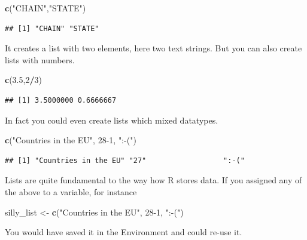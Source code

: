 \documentclass[
]{article}
\newenvironment{Shaded}{\begin{snugshade}}{\end{snugshade}}
\newcommand{\DecValTok}[1]{\textcolor[rgb]{0.00,0.00,0.81}{#1}}
\newcommand{\FloatTok}[1]{\textcolor[rgb]{0.00,0.00,0.81}{#1}}
\newcommand{\FunctionTok}[1]{\textcolor[rgb]{0.13,0.29,0.53}{\textbf{#1}}}
\newcommand{\NormalTok}[1]{#1}
\newcommand{\OtherTok}[1]{\textcolor[rgb]{0.56,0.35,0.01}{#1}}
\newcommand{\SpecialCharTok}[1]{\textcolor[rgb]{0.81,0.36,0.00}{\textbf{#1}}}
\newcommand{\StringTok}[1]{\textcolor[rgb]{0.31,0.60,0.02}{#1}}
\begin{document}
\begin{Shaded}
\begin{Highlighting}[]
\FunctionTok{c}\NormalTok{(}\StringTok{"CHAIN"}\NormalTok{,}\StringTok{"STATE"}\NormalTok{)}
\end{Highlighting}
\end{Shaded}

\begin{verbatim}
## [1] "CHAIN" "STATE"
\end{verbatim}

It creates a list with two elements, here two text strings. But you can
also create lists with numbers.

\begin{Shaded}
\begin{Highlighting}[]
\FunctionTok{c}\NormalTok{(}\FloatTok{3.5}\NormalTok{,}\DecValTok{2}\SpecialCharTok{/}\DecValTok{3}\NormalTok{)}
\end{Highlighting}
\end{Shaded}

\begin{verbatim}
## [1] 3.5000000 0.6666667
\end{verbatim}

In fact you could even create lists which mixed datatypes.

\begin{Shaded}
\begin{Highlighting}[]
\FunctionTok{c}\NormalTok{(}\StringTok{"Countries in the EU"}\NormalTok{, }\DecValTok{28{-}1}\NormalTok{, }\StringTok{":{-}("}\NormalTok{)}
\end{Highlighting}
\end{Shaded}

\begin{verbatim}
## [1] "Countries in the EU" "27"                  ":-("
\end{verbatim}

Lists are quite fundamental to the way how R stores data. If you
assigned any of the above to a variable, for instance

\begin{Shaded}
\begin{Highlighting}[]
\NormalTok{silly\_list }\OtherTok{\textless{}{-}} \FunctionTok{c}\NormalTok{(}\StringTok{"Countries in the EU"}\NormalTok{, }\DecValTok{28{-}1}\NormalTok{, }\StringTok{":{-}("}\NormalTok{)}
\end{Highlighting}
\end{Shaded}

You would have saved it in the Environment and could re-use it.
\end{document}
